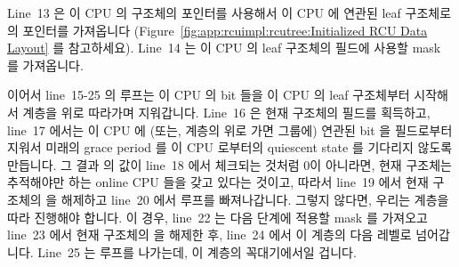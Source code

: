Line~13 은 이 CPU 의  구조체의  포인터를 사용해서 이
CPU 에 연관된 leaf  구조체로의 포인터를 가져옵니다
(Figure~\ref{fig:app:rcuimpl:rcutree:Initialized RCU Data Layout} 를
참고하세요).
Line~14 는 이 CPU 의 leaf  구조체의  필드에 사용할 mask
를 가져옵니다.
\iffalse

Line~13 picks up a pointer to the leaf \co{rcu_node} structure corresponding
to this CPU, using the \co{->mynode} pointer in this CPU's \co{rcu_data}
structure
(see Figure~\ref{fig:app:rcuimpl:rcutree:Initialized RCU Data Layout}).
Line~14 picks up a mask with this CPU's bit set for use on
the leaf \co{rcu_node} structure's \co{qsmask} field.
\fi

이어서 line~15-25 의 루프는 이 CPU 의 bit 들을 이 CPU 의 leaf 
구조체부터 시작해서  계층을 위로 따라가며 지워갑니다.
Line~16 은 현재  구조체의  필드를 획득하고, line~17
에서는 이 CPU 에 (또는, 계층의 위로 가면 그룹에) 연관된 bit 을
 필드로부터 지워서 미래의 grace period 를 이 CPU 로부터의
quiescent state 를 기다리지 않도록 만듭니다.
그 결과  의 값이 line~18 에서 체크되는 것처럼 0이 아니라면,
현재  구조체는 추적해야만 하는 online CPU 들을 갖고 있다는 것이고,
따라서 line~19 에서 현재  구조체의  을 해제하고 line~20
에서 루프를 빠져나갑니다.
그렇지 않다면, 우리는  계층을 따라 진행해야 합니다.
이 경우, line~22 는 다음 단계에 적용할 mask 를 가져오고 line~23 에서 현재
 구조체의  을 해제한 후, line~24 에서 이 계층의 다음
레벨로 넘어갑니다.
Line~25 는 루프를 나가는데, 이 계층의 꼭대기에서일 겁니다.
\iffalse

The loop spanning lines~15-25 then clears this CPU's bits up the
\co{rcu_node} hierarchy, starting with this CPU's leaf \co{rcu_node}
structure.
Line~16 acquires the current \co{rcu_node} structure's \co{->lock}
field, and line~17 clears the bit corresponding to this CPU
(or group, higher up in the hierarchy) from the \co{->qsmaskinit}
field, so that future grace periods will not wait on quiescent states
from this CPU.
If the resulting \co{->qsmaskinit} value is non-zero, as checked by
line~18, then the
current \co{rcu_node} structure has other online CPUs that it
must track, so line~19 releases the current \co{rcu_node} structure's
\co{->lock} and line~20 exits the loop.
Otherwise, we need to continue walking up the \co{rcu_node} hierarchy.
In this case, line~22 picks up the mask to apply to the next level up,
line~23 releases the current \co{rcu_node} structure's \co{->lock},
and line~24 advances up to the next level of the hierarchy.
Line~25 exits the loop should we exit out the top of the hierarchy.
\fi

